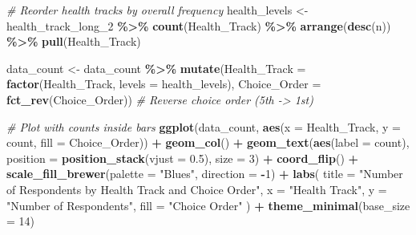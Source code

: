 \documentclass[
]{article}
\newenvironment{Shaded}{\begin{snugshade}}{\end{snugshade}}
\newcommand{\AttributeTok}[1]{\textcolor[rgb]{0.13,0.29,0.53}{#1}}
\newcommand{\CommentTok}[1]{\textcolor[rgb]{0.56,0.35,0.01}{\textit{#1}}}
\newcommand{\DecValTok}[1]{\textcolor[rgb]{0.00,0.00,0.81}{#1}}
\newcommand{\FloatTok}[1]{\textcolor[rgb]{0.00,0.00,0.81}{#1}}
\newcommand{\FunctionTok}[1]{\textcolor[rgb]{0.13,0.29,0.53}{\textbf{#1}}}
\newcommand{\NormalTok}[1]{#1}
\newcommand{\OtherTok}[1]{\textcolor[rgb]{0.56,0.35,0.01}{#1}}
\newcommand{\SpecialCharTok}[1]{\textcolor[rgb]{0.81,0.36,0.00}{\textbf{#1}}}
\newcommand{\StringTok}[1]{\textcolor[rgb]{0.31,0.60,0.02}{#1}}
\begin{document}
\begin{Shaded}
\begin{Highlighting}[]
\CommentTok{\# Reorder health tracks by overall frequency}
\NormalTok{health\_levels }\OtherTok{\textless{}{-}}\NormalTok{ health\_track\_long\_2 }\SpecialCharTok{\%\textgreater{}\%}
  \FunctionTok{count}\NormalTok{(Health\_Track) }\SpecialCharTok{\%\textgreater{}\%}
  \FunctionTok{arrange}\NormalTok{(}\FunctionTok{desc}\NormalTok{(n)) }\SpecialCharTok{\%\textgreater{}\%}
  \FunctionTok{pull}\NormalTok{(Health\_Track)}

\NormalTok{data\_count }\OtherTok{\textless{}{-}}\NormalTok{ data\_count }\SpecialCharTok{\%\textgreater{}\%}
  \FunctionTok{mutate}\NormalTok{(}\AttributeTok{Health\_Track =} \FunctionTok{factor}\NormalTok{(Health\_Track, }\AttributeTok{levels =}\NormalTok{ health\_levels),}
         \AttributeTok{Choice\_Order =} \FunctionTok{fct\_rev}\NormalTok{(Choice\_Order))  }\CommentTok{\# Reverse choice order (5th {-}\textgreater{} 1st)}
\end{Highlighting}
\end{Shaded}

\begin{Shaded}
\begin{Highlighting}[]
\CommentTok{\# Plot with counts inside bars}
\FunctionTok{ggplot}\NormalTok{(data\_count, }\FunctionTok{aes}\NormalTok{(}\AttributeTok{x =}\NormalTok{ Health\_Track, }\AttributeTok{y =}\NormalTok{ count, }\AttributeTok{fill =}\NormalTok{ Choice\_Order)) }\SpecialCharTok{+}
  \FunctionTok{geom\_col}\NormalTok{() }\SpecialCharTok{+}
  \FunctionTok{geom\_text}\NormalTok{(}\FunctionTok{aes}\NormalTok{(}\AttributeTok{label =}\NormalTok{ count), }\AttributeTok{position =} \FunctionTok{position\_stack}\NormalTok{(}\AttributeTok{vjust =} \FloatTok{0.5}\NormalTok{), }\AttributeTok{size =} \DecValTok{3}\NormalTok{) }\SpecialCharTok{+}
  \FunctionTok{coord\_flip}\NormalTok{() }\SpecialCharTok{+}
  \FunctionTok{scale\_fill\_brewer}\NormalTok{(}\AttributeTok{palette =} \StringTok{"Blues"}\NormalTok{, }\AttributeTok{direction =} \SpecialCharTok{{-}}\DecValTok{1}\NormalTok{) }\SpecialCharTok{+}
  \FunctionTok{labs}\NormalTok{(}
    \AttributeTok{title =} \StringTok{"Number of Respondents by Health Track and Choice Order"}\NormalTok{,}
    \AttributeTok{x =} \StringTok{"Health Track"}\NormalTok{,}
    \AttributeTok{y =} \StringTok{"Number of Respondents"}\NormalTok{,}
    \AttributeTok{fill =} \StringTok{"Choice Order"}
\NormalTok{  ) }\SpecialCharTok{+}
  \FunctionTok{theme\_minimal}\NormalTok{(}\AttributeTok{base\_size =} \DecValTok{14}\NormalTok{)}
\end{Highlighting}
\end{Shaded}
\end{document}
